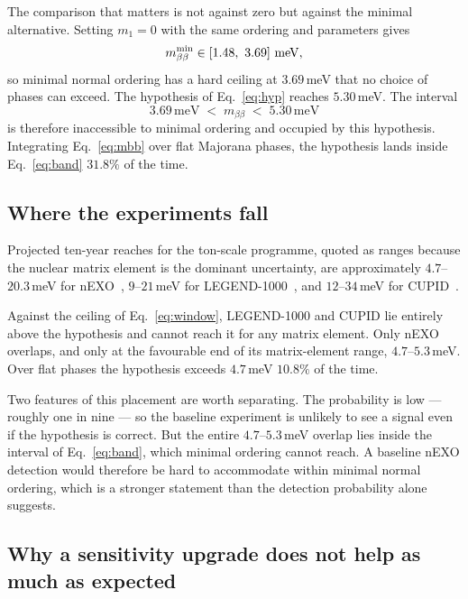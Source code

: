 \documentclass[aps,prd,twocolumn,superscriptaddress,nofootinbib,10pt]{revtex4-2}
\begin{document}
The comparison that matters is not against zero but against the minimal alternative. Setting
$m_1 = 0$ with the same ordering and parameters gives
%
\begin{equation}
  m_{\beta\beta}^{\rm min} \in [1.48,\ 3.69]\ \mathrm{meV},
  \label{eq:minimal}
\end{equation}
%
so minimal normal ordering has a hard ceiling at $3.69\,$meV that no choice of phases can exceed.
The hypothesis of Eq.~\eqref{eq:hyp} reaches $5.30\,$meV. The interval
%
\begin{equation}
  3.69\,\mathrm{meV} \;<\; m_{\beta\beta} \;<\; 5.30\,\mathrm{meV}
  \label{eq:band}
\end{equation}
%
is therefore inaccessible to minimal ordering and occupied by this hypothesis. Integrating
Eq.~\eqref{eq:mbb} over flat Majorana phases, the hypothesis lands inside Eq.~\eqref{eq:band}
$31.8\%$ of the time.

\subsection{Where the experiments fall}

Projected ten-year reaches for the ton-scale programme, quoted as ranges because the nuclear matrix
element is the dominant uncertainty, are approximately $4.7$--$20.3\,$meV for
nEXO~\cite{nEXO2021}, $9$--$21\,$meV for LEGEND-1000~\cite{LEGEND1000}, and $12$--$34\,$meV for
CUPID~\cite{CUPID2019}.

Against the ceiling of Eq.~\eqref{eq:window}, LEGEND-1000 and CUPID lie entirely above the
hypothesis and cannot reach it for any matrix element. Only nEXO overlaps, and only at the
favourable end of its matrix-element range, $4.7$--$5.3\,$meV. Over flat phases the hypothesis
exceeds $4.7\,$meV $10.8\%$ of the time.

Two features of this placement are worth separating. The probability is low --- roughly one in nine
--- so the baseline experiment is unlikely to see a signal even if the hypothesis is correct. But
the entire $4.7$--$5.3\,$meV overlap lies inside the interval of Eq.~\eqref{eq:band}, which minimal
ordering cannot reach. A baseline nEXO detection would therefore be hard to accommodate within
minimal normal ordering, which is a stronger statement than the detection probability alone
suggests.

\subsection{Why a sensitivity upgrade does not help as much as expected}
\end{document}
